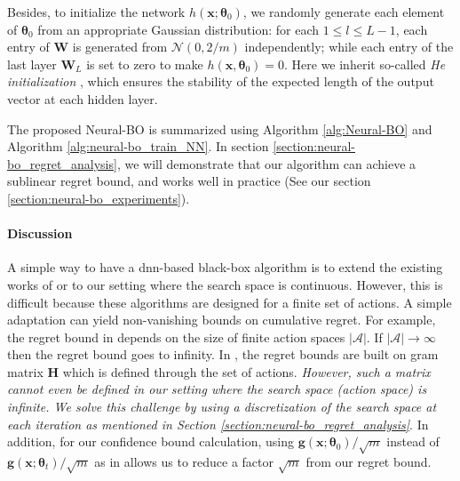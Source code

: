 
Besides, to initialize the network $h(\mathbf{x}; \boldsymbol{\theta}_0)$, we randomly generate each element of $\boldsymbol{\theta}_0$ from an appropriate Gaussian distribution: for each $1 \leq l \leq L-1$, each entry of $\mathbf{W}$ is generated from $\mathcal N(0, 2/m)$ independently; while each entry of the last layer $\mathbf{W}_L$ is set to zero to make $h(\mathbf{x}, \boldsymbol{\theta}_0) = 0$. Here we inherit so-called \emph{He initialization} \citep{he2015delving}, which ensures the stability of the expected length of the output vector at each hidden layer. 

The proposed Neural-BO is summarized using Algorithm \ref{alg:Neural-BO} and Algorithm \ref{alg:neural-bo_train_NN}. In section \ref{section:neural-bo_regret_analysis}, we will demonstrate that our algorithm can achieve a sublinear regret bound, and works well in practice (See our section \ref{section:neural-bo_experiments}).
\paragraph{Discussion}
A simple way to have a \ac{dnn}-based black-box algorithm is to extend the existing works of \citet{zhou2020neural,zhang2021neural} or \citet{kassraie2022neural} to our setting where the search space is continuous. However, this is difficult because these algorithms are designed for a finite set of actions. A simple adaptation can yield non-vanishing bounds on cumulative regret. For example, the regret bound in \citet{kassraie2022neural} depends on the size of finite action spaces $\lvert \mathcal A \rvert$. If $\lvert \mathcal A \rvert \rightarrow \infty$ then the regret bound goes to infinity. In \citet{zhou2020neural,zhang2021neural}, the regret bounds are built on gram matrix $\mathbf{H}$ which is defined through the set of actions. \textit{However, such a matrix cannot even be defined in our setting where the search space (action space) is infinite. We solve this challenge by using a discretization of the search space at each iteration as mentioned in Section \ref{section:neural-bo_regret_analysis}}. In addition, for our confidence bound calculation, using $\mathbf{g}(\mathbf{x};\boldsymbol{\theta}_0)/\sqrt{m}$ instead of $\mathbf{g}(\mathbf{x};\boldsymbol{\theta}_t)/\sqrt{m}$ as in \citet{zhou2020neural,zhang2021neural} allows us to reduce a factor $\sqrt{m}$ from our regret bound.    

